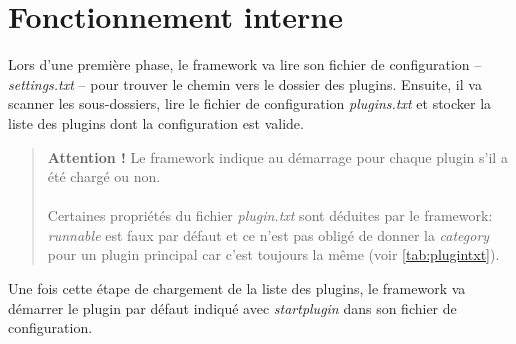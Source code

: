 \documentclass[12pt,a4paper]{article}
\begin{document}
\section{Fonctionnement interne}
Lors d'une première phase, le framework va lire son fichier de configuration -- 
\emph{settings.txt} -- pour trouver le chemin vers le dossier des plugins. 
Ensuite, il va scanner les sous-dossiers, lire le fichier de configuration 
\emph{plugins.txt} et stocker la liste des plugins dont la configuration est valide.

\begin{quote}
	\textbf{Attention !} Le framework indique au démarrage pour chaque plugin 
	s'il a été chargé ou non. 
	\\\\
	Certaines propriétés du fichier \emph{plugin.txt} sont déduites par le 
	framework: \emph{runnable} est faux par défaut et ce n'est pas obligé de 
	donner la \emph{category} pour un plugin principal car c'est toujours la 
	même (voir \ref{tab:plugintxt}).
\end{quote}

Une fois cette étape de chargement de la liste des plugins, le framework va 
démarrer le plugin par défaut indiqué avec \emph{startplugin} dans son fichier 
de configuration.
\end{document}
